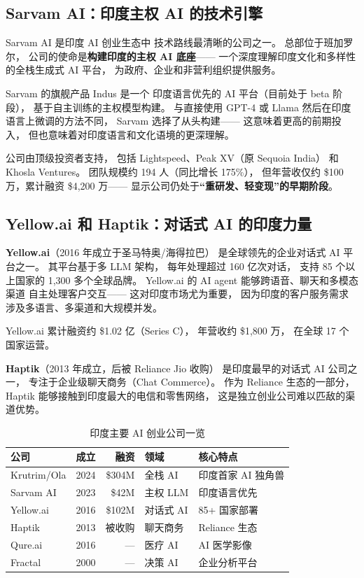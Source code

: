 \subsection{Sarvam AI：印度主权 AI 的技术引擎}

Sarvam AI 是印度 AI 创业生态中
技术路线最清晰的公司之一。
总部位于班加罗尔，
公司的使命是\textbf{构建印度的主权 AI 底座}——
一个深度理解印度文化和多样性的全栈生成式 AI 平台，
为政府、企业和非营利组织提供服务。

Sarvam 的旗舰产品 Indus 是一个
印度语言优先的 AI 平台（目前处于 beta 阶段），
基于自主训练的主权模型构建。
与直接使用 GPT-4 或 Llama
然后在印度语言上微调的方法不同，
Sarvam 选择了从头构建——
这意味着更高的前期投入，
但也意味着对印度语言和文化语境的更深理解。

公司由顶级投资者支持，
包括 Lightspeed、Peak XV（原 Sequoia India）
和 Khosla Ventures。
团队规模约 194 人（同比增长 175\%），
但年营收仅约 \$100 万，累计融资 \$4,200 万——
显示公司仍处于\textbf{``重研发、轻变现''的早期阶段}。

\subsection{Yellow.ai 和 Haptik：对话式 AI 的印度力量}

\textbf{Yellow.ai}（2016 年成立于圣马特奥/海得拉巴）
是全球领先的企业对话式 AI 平台之一。
其平台基于多 LLM 架构，
每年处理超过 160 亿次对话，
支持 85 个以上国家的 1,300 多个全球品牌。
Yellow.ai 的 AI agent 能够跨语音、聊天和多模态渠道
自主处理客户交互——
这对印度市场尤为重要，
因为印度的客户服务需求
涉及多语言、多渠道和大规模并发。

Yellow.ai 累计融资约 \$1.02 亿（Series C），
年营收约 \$1,800 万，
在全球 17 个国家运营。

\textbf{Haptik}（2013 年成立，后被 Reliance Jio 收购）
是印度最早的对话式 AI 公司之一，
专注于企业级聊天商务（Chat Commerce）。
作为 Reliance 生态的一部分，
Haptik 能够接触到印度最大的电信和零售网络，
这是独立创业公司难以匹敌的渠道优势。

\begin{table}[htbp]
\centering
\caption{印度主要 AI 创业公司一览}
\label{tab:india-ai}
\small
\begin{tabularx}{\textwidth}{l l r l X}
\toprule
\rowcolor{figLightGray}
\textbf{公司} & \textbf{成立} & \textbf{融资} & \textbf{领域} & \textbf{核心特点} \\
\midrule
Krutrim/Ola & 2024 & \$304M   & 全栈 AI      & 印度首家 AI 独角兽 \\
Sarvam AI   & 2023 & \$42M    & 主权 LLM     & 印度语言优先 \\
Yellow.ai   & 2016 & \$102M   & 对话式 AI    & 85+ 国家部署 \\
Haptik      & 2013 & 被收购    & 聊天商务     & Reliance 生态 \\
Qure.ai     & 2016 & —        & 医疗 AI      & AI 医学影像 \\
Fractal     & 2000 & —        & 决策 AI      & 企业分析平台 \\
\bottomrule
\end{tabularx}
\end{table}

